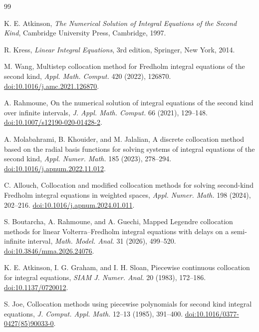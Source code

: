\documentclass[11pt,a4paper]{amsart}
\theoremstyle{plain}
\theoremstyle{definition}
\theoremstyle{remark}
\begin{document}
\begin{thebibliography}{99}


K. E. Atkinson,
\emph{The Numerical Solution of Integral Equations of the Second Kind},
Cambridge University Press, Cambridge, 1997.

R. Kress,
\emph{Linear Integral Equations}, 3rd edition,
Springer, New York, 2014.

M. Wang,
Multistep collocation method for Fredholm integral equations of the second kind,
\emph{Appl. Math. Comput.} 420 (2022), 126870.
\href{https://doi.org/10.1016/j.amc.2021.126870}{doi:10.1016/j.amc.2021.126870}.

A. Rahmoune,
On the numerical solution of integral equations of the second kind over infinite intervals,
\emph{J. Appl. Math. Comput.} 66 (2021), 129--148.
\href{https://doi.org/10.1007/s12190-020-01428-2}{doi:10.1007/s12190-020-01428-2}.

A. Molabahrami, B. Khouider, and M. Jalalian,
A discrete collocation method based on the radial basis functions for solving systems of integral equations of the second kind,
\emph{Appl. Numer. Math.} 185 (2023), 278--294.
\href{https://doi.org/10.1016/j.apnum.2022.11.012}{doi:10.1016/j.apnum.2022.11.012}.

C. Allouch,
Collocation and modified collocation methods for solving second-kind Fredholm integral equations in weighted spaces,
\emph{Appl. Numer. Math.} 198 (2024), 202--216.
\href{https://doi.org/10.1016/j.apnum.2024.01.011}{doi:10.1016/j.apnum.2024.01.011}.

S. Boutarcha, A. Rahmoune, and A. Guechi,
Mapped Legendre collocation methods for linear Volterra--Fredholm integral equations with delays on a semi-infinite interval,
\emph{Math. Model. Anal.} 31 (2026), 499--520.
\href{https://doi.org/10.3846/mma.2026.24076}{doi:10.3846/mma.2026.24076}.

K. E. Atkinson, I. G. Graham, and I. H. Sloan,
Piecewise continuous collocation for integral equations,
\emph{SIAM J. Numer. Anal.} 20 (1983), 172--186.
\href{https://doi.org/10.1137/0720012}{doi:10.1137/0720012}.

S. Joe,
Collocation methods using piecewise polynomials for second kind integral equations,
\emph{J. Comput. Appl. Math.} 12--13 (1985), 391--400.
\href{https://doi.org/10.1016/0377-0427(85)90033-0}{doi:10.1016/0377-0427(85)90033-0}.


\end{thebibliography}
\end{document}
